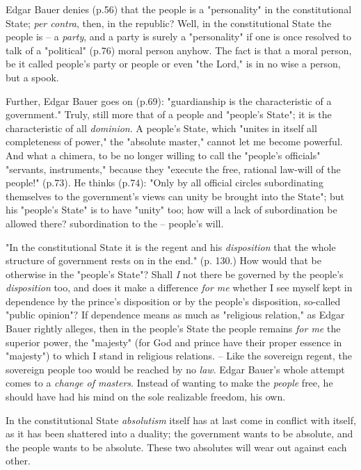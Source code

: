 Edgar Bauer denies (p.56) that the people is a "{}personality"{} in the 
constitutional State; \textit{per contra}, then, in the republic? Well, in the 
constitutional State the people is -- a \textit{party}, and a party is surely 
a "{}personality"{} if one is once resolved to talk of a "{}political"{} 
(p.76) moral person anyhow. The fact is that a moral person, be it called 
people's party or people or even "{}the Lord,"{} is in no wise a person, but a 
spook.

Further, Edgar Bauer goes on (p.69): "{}guardianship is the characteristic of 
a government."{} Truly, still more that of a people and "{}people's State"{}; 
it is the characteristic of all \textit{dominion}. A people's State, which 
"{}unites in itself all completeness of power,"{} the "{}absolute master,"{} 
cannot let me become powerful. And what a chimera, to be no longer willing to 
call the "{}people's officials"{} "{}servants, instruments,"{} because they 
"{}execute the free, rational law-will of the people!"{} (p.73). He thinks 
(p.74): "{}Only by all official circles subordinating themselves to the 
government's views can unity be brought into the State"{}; but his "{}people's 
State"{} is to have "{}unity"{} too; how will a lack of subordination be 
allowed there? subordination to the -- people's will.

"{}In the constitutional State it is the regent and his \textit{disposition} 
that the whole structure of government rests on in the end."{} (p. 130.) How 
would that be otherwise in the "{}people's State"{}? Shall \textit{I} not 
there be governed by the people's \textit{disposition} too, and does it make a 
difference \textit{for me} whether I see myself kept in dependence by the 
prince's disposition or by the people's disposition, so-called "{}public 
opinion"{}? If dependence means as much as "{}religious relation,"{} as Edgar 
Bauer rightly alleges, then in the people's State the people remains 
\textit{for me} the superior power, the "{}majesty"{} (for God and prince have 
their proper essence in "{}majesty"{}) to which I stand in religious 
relations. -- Like the sovereign regent, the sovereign people too would be 
reached by no \textit{law}. Edgar Bauer's whole attempt comes to a 
\textit{change of masters}. Instead of wanting to make the \textit{people} 
free, he should have had his mind on the sole realizable freedom, his own.

In the constitutional State \textit{absolutism} itself has at last come in 
conflict with itself, as it has been shattered into a duality; the government 
wants to be absolute, and the people wants to be absolute. These two absolutes 
will wear out against each other.

